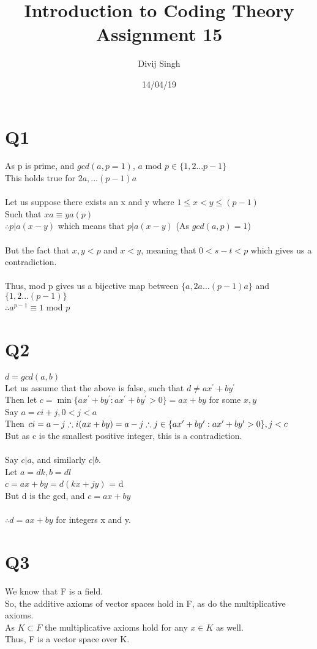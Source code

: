 \documentclass{article}
\title{Introduction to Coding Theory Assignment 15}
\author{Divij Singh}
\date{14/04/19}
\begin{document}
	\maketitle
	
	\section{Q1}
As p is prime, and $gcd(a,p = 1)$, $a$ mod $p \in \{1,2...p-1\}$\\
This holds true for $2a, ... (p-1)a$\\\\
Let us suppose there exists an x and y where $1\leq x < y \leq (p-1)$\\
Such that $xa \equiv ya(p)$\\
$\therefore p | a(x-y)$ which means that $p | a(x-y)$ (As $gcd(a,p) = 1$)\\\\
But the fact that $x,y <p$ and $x<y$, meaning that $0 < s-t<p$ which gives us a contradiction.\\\\
Thus, mod p gives us a bijective map between $\{a,2a...(p-1)a \}$ and $ \{1,2...(p-1) \} $\\
$\therefore a^{p-1} \equiv 1$ mod $p$\\

\section{Q2}
$d = gcd(a,b)$\\
Let us assume that the above is false, such that $d \neq a x^{\prime}+b y^{\prime}$\\
Then let $c=\min \{a x^{\prime}+b y^{\prime} : a x^{\prime}+b y^{\prime}>0\}=a x+b y$ for some $x, y$\\
Say $ a =ci + j, 0 < j < a$\\
Then $ci = a-j\\
\therefore i(ax+by) = a - j\\
\therefore j \in \{a x^{\prime}+b y^{\prime} : a x^{\prime}+b y^{\prime}>0\}, j <c$\\
But as c is the smallest positive integer, this is a contradiction.\\\\
Say $c|a$, and similarly $c|b$.\\
Let $a = dk, b = dl$\\
$c = ax + by = d(kx + jy)$ = d\\
But d is the gcd, and $c= ax + by$\\\\
$\therefore d = ax+by$ for integers x and y.

\section{Q3}
We know that F is a field.\\
So, the additive axioms of vector spaces hold in F, as do the multiplicative axioms.\\
As $K \subset F$ the multiplicative axioms hold for any $x \in K$ as well.\\
Thus, F is a vector space over K.

	
\end{document}

